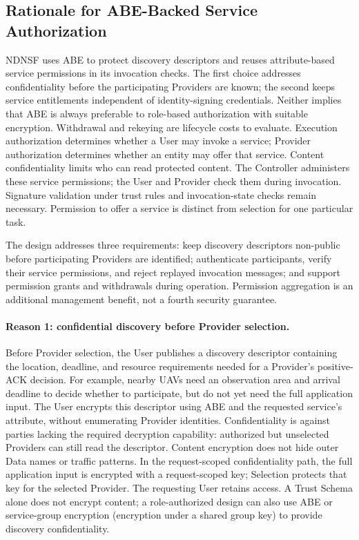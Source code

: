 \subsection{Rationale for ABE-Backed Service Authorization}
\label{sec:abe-rationale}

NDNSF uses ABE to protect discovery descriptors and reuses attribute-based
service permissions in its invocation checks. The first choice addresses
confidentiality before the participating Providers are known; the second
keeps service entitlements independent of identity-signing credentials.
Neither implies that ABE is always preferable to role-based authorization
with suitable encryption. Withdrawal and rekeying are lifecycle costs to evaluate.
Execution authorization determines whether a User may invoke a service;
Provider authorization determines whether an entity may offer that service.
Content confidentiality limits who can read protected content. The Controller
administers these service permissions; the User and Provider check them during
invocation. Signature validation under trust rules and invocation-state checks
remain necessary. Permission to offer a service is distinct from selection for
one particular task.

The design addresses three requirements: keep discovery descriptors non-public
before participating Providers are identified; authenticate participants, verify
their service permissions, and reject replayed invocation messages; and support
permission grants and withdrawals during operation. Permission aggregation is
an additional management benefit, not a fourth security guarantee.

\paragraph{Reason 1: confidential discovery before Provider selection.}
Before Provider selection, the User publishes a discovery descriptor containing
the location, deadline, and resource requirements needed for a Provider's
positive-ACK decision. For example, nearby UAVs need an observation area and
arrival deadline to decide whether to participate, but do not yet need the full
application input. The User encrypts this descriptor using ABE and the requested
service's attribute, without enumerating Provider identities. Confidentiality is against parties
lacking the required decryption capability: authorized but unselected Providers
can still read the descriptor. Content encryption does not hide outer Data names
or traffic patterns. In the request-scoped confidentiality path, the full
application input is encrypted with a request-scoped key; Selection protects
that key for the selected Provider. The requesting User retains access. A Trust Schema alone does
not encrypt content; a role-authorized design can also use ABE or service-group
encryption (encryption under a shared group key) to provide discovery confidentiality.


